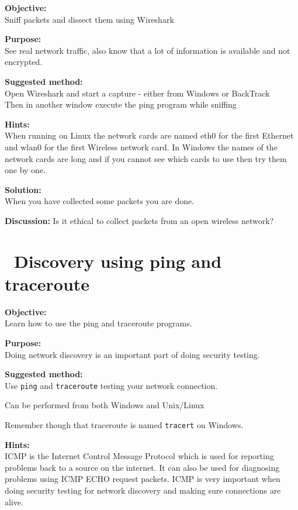 \documentclass[a4paper,11pt,notitlepage]{report}
\begin{document}
{\bf Objective:}\\
Sniff packets and dissect them using Wireshark

{\bf Purpose:}\\
See real network traffic, also know that a lot of information is available and not encrypted.

{\bf Suggested method:}\\
Open Wireshark and start a capture - either from Windows or BackTrack\\
Then in another window execute the ping program while sniffing

{\bf Hints:}\\
When running on Linux the network cards are named eth0 for the first Ethernet and wlan0 for the first Wireless network card. In Windows the names of the network cards are long and if you cannot see which cards to use then try them one by one.

{\bf Solution:}\\
When you have collected some packets you are done.

{\bf Discussion:}
Is it ethical to collect packets from an open wireless network?

\chapter{\faInfoCircle\ Discovery using ping and traceroute}
\label{ex:ping}

{\bf Objective:}\\
Learn how to use the ping and traceroute programs.

{\bf Purpose:}\\
Doing network discovery is an important part of doing security testing.

{\bf Suggested method:} \\
Use \verb+ping+ and \verb+traceroute+ testing your network connection.

Can be performed from both Windows and Unix/Linux

Remember though that traceroute is named \verb+tracert+ on Windows.

{\bf Hints:} \\
ICMP is the Internet Control Message Protocol which is used for reporting problems back to a source on the internet. It can also be used for diagnosing problems using ICMP ECHO request packets. ICMP is very important when doing security testing for network discovery and making sure connections are alive.
\end{document}
